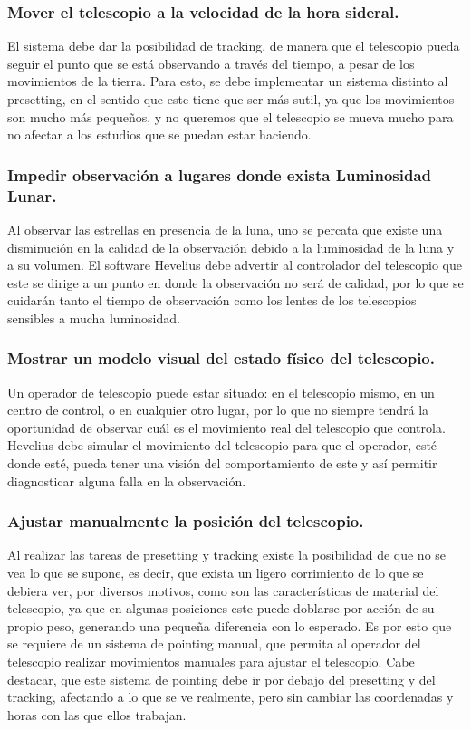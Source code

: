 \documentclass[letterpaper,spanish,10pt]{article}
\begin{document}
\subsubsection{Mover el telescopio a la velocidad de la hora sideral.}
El sistema debe dar la posibilidad de tracking, de manera que el telescopio pueda seguir el punto que se está observando a través del tiempo, a pesar de los movimientos de la tierra. Para esto, se debe implementar un sistema distinto al presetting, en el sentido que este tiene que ser más sutil, ya que los movimientos son mucho más pequeños, y no queremos que el telescopio se mueva mucho para no afectar a los estudios que se puedan estar haciendo.

\subsubsection{Impedir observaci\'on a lugares donde exista Luminosidad Lunar.}
Al observar las estrellas en presencia de la luna, uno se percata que existe una disminución en la calidad de la observación debido a la luminosidad de la luna y a su volumen. El software Hevelius debe advertir al controlador del telescopio que este se dirige a un punto en donde la observación no será de calidad, por lo que se cuidarán tanto el tiempo de observación como los lentes de los telescopios sensibles a mucha luminosidad.

\subsubsection{Mostrar un modelo visual del estado f\'isico del telescopio.}
Un operador de telescopio puede estar situado: en el telescopio mismo, en un centro de control, o en cualquier otro lugar, por lo que no siempre tendrá la oportunidad de observar cuál es el movimiento real del telescopio que controla. Hevelius debe simular el movimiento del telescopio para que el operador, esté donde esté, pueda tener una visión del comportamiento de este y así permitir diagnosticar alguna falla en la observación.

\subsubsection{Ajustar manualmente la posici\'on del telescopio.}
Al realizar las tareas de presetting y tracking existe la posibilidad de que no se vea lo que se supone, es decir, que exista un ligero corrimiento de lo que se debiera ver, por diversos motivos, como son las características de material del telescopio, ya que en algunas posiciones este puede doblarse por acción de su propio peso, generando una pequeña diferencia con lo esperado. Es por esto que se requiere de un sistema de pointing manual, que permita al operador del telescopio realizar movimientos manuales para ajustar el telescopio. Cabe destacar, que este sistema de pointing debe ir por debajo del presetting y del tracking, afectando a lo que se ve realmente, pero sin cambiar las coordenadas y horas con las que ellos trabajan.
\end{document}
